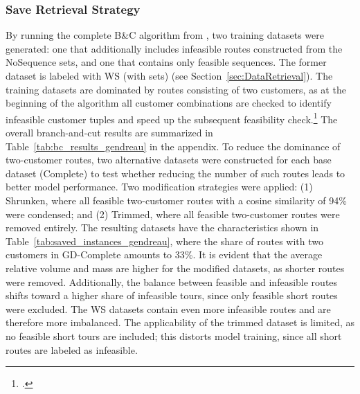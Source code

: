 \subsubsection{Save Retrieval Strategy}
By running the complete B\&C algorithm from \cite{tamke_branch-and-cut_2024}, two training datasets were generated: one that additionally
includes infeasible routes constructed from the NoSequence sets, and one that contains only feasible sequences. The former dataset is
labeled with WS (with sets) (see Section~\ref{sec:DataRetrieval}).
The training datasets are dominated by routes consisting of two customers, as at the beginning of the algorithm all customer combinations
are checked to identify infeasible customer tuples and speed up the subsequent feasibility check.\footcite[cf.][]{tamke_branch-and-cut_2024}
The overall branch-and-cut results are summarized in Table~\ref{tab:bc_results_gendreau} in the appendix.
To reduce the dominance of two-customer routes, two alternative datasets were constructed for each base dataset (Complete) to test
whether reducing the number of such routes leads to better model performance. Two modification strategies were applied: (1) Shrunken,
where all feasible two-customer routes with a cosine similarity of 94\% were condensed; and (2) Trimmed, where all feasible two-customer
routes were removed entirely.
The resulting datasets have the characteristics shown in Table~\ref{tab:saved_instances_gendreau},
where the share of routes with two customers in GD-Complete amounts to 33\%. It is evident that the average
relative volume and mass are higher for the modified datasets, as shorter routes were removed. Additionally, the balance between feasible
and infeasible routes shifts toward a higher share of infeasible tours, since only feasible short routes were excluded. The WS datasets
contain even more infeasible routes and are therefore more imbalanced. The applicability of the trimmed dataset is limited, as no feasible
short tours are included; this distorts model training, since all short routes are labeled as infeasible.

